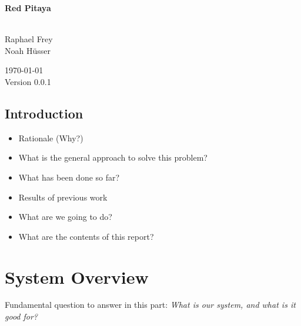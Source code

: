 \documentclass[a4paper,oneside]{alpenthesis/alpenthesis}
\begin{document}
\begin{titlingpage} %
    \flushright\sffamily

    \vspace*{5em}
    \Huge\bfseries{Red Pitaya}\\[1ex]
    \Large{}\\[3ex]

    \normalsize\mdseries
    
    \vfill
    Raphael Frey\\
    Noah H\"usser\\[3ex]

    \vspace{5em}

    \today\\
    Version 0.0.1
\end{titlingpage} %

\frontmatter %
\tableofcontents*

\mainmatter

\chapter{Introduction} %
\label{ch:intro}

\begin{itemize}\firmlist
    \item Rationale (Why?)
    \item What is the general approach to solve this problem?
    \item What has been done so far?
    \item Results of previous work
    \item What are we going to do?
    \item What are the contents of this report?
\end{itemize}


\part{System Overview} %
\label{part:System_Overview}

Fundamental question  to answer in  this part:  \emph{What is our  system, and
what is it good for?}
\end{document}
